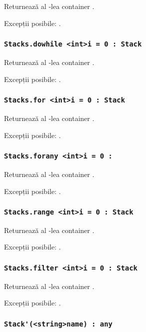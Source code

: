 Returnează al -lea container .

Excepții posibile: .

\subsubsection{\lstinline|Stacks.dowhile <int>i = 0 : Stack|}

Returnează al -lea container .

Excepții posibile: .

\subsubsection{\lstinline|Stacks.for <int>i = 0 : Stack|}

Returnează al -lea container .

Excepții posibile: .

\subsubsection{\lstinline|Stacks.forany <int>i = 0 : |}

Returnează al -lea container .

Excepții posibile: .

\subsubsection{\lstinline|Stacks.range <int>i = 0 : Stack|}

Returnează al -lea container .

Excepții posibile: .

\subsubsection{\lstinline|Stacks.filter <int>i = 0 : Stack|}

Returnează al -lea container .

Excepții posibile: .

\subsubsection{\lstinline|Stack'(<string>name) : any|}

